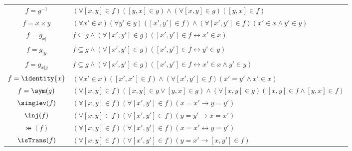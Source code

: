 \documentclass[submission,copyright,creativecommons]{eptcs}
\newcommand{\svx}{x}
\newcommand{\svy}{y}
\newcommand{\mvx}{f}
\newcommand{\mvy}{g}
\begin{document}
\begin{table}[h]
\begin{center}
\begin{small}
\begin{tabular}{|c|l|}
$\mvx=\mvy^{-1}$ & $(\forall [\svx, \svy] \in \mvx)([\svy, \svx] \in \mvy) \wedge (\forall [\svx, \svy] \in \mvy)([\svy, \svx] \in \mvx)$\\[0.0cm]

$\mvx=\svx \times \svy$ & $(\forall \svx' \in \svx)(\forall \svy' \in \svy)([\svx',\svy'] \in \mvx) \wedge
  (\forall [\svx',\svy'] \in \mvx)(\svx' \in \svx \wedge \svy' \in \svy)$\\[0.0cm]

$\mvx=\mvy_{\svx|}$ & $\mvx \subseteq \mvy \wedge (\forall [\svx',\svy'] \in \mvy)([\svx',\svy'] \in \mvx \leftrightarrow \svx' \in \svx)$\\[0.0cm] 

$\mvx=\mvy_{|\svy}$ & $\mvx \subseteq \mvy \wedge (\forall [\svx',\svy'] \in \mvy)([\svx',\svy'] \in \mvx \leftrightarrow \svy' \in \svy)$\\[0.0cm] 

$\mvx=\mvy_{\svx|\svy}$ & $\mvx \subseteq \mvy \wedge (\forall [\svx',\svy'] \in \mvy)([\svx',\svy'] \in \mvx \leftrightarrow \svx' \in \svx \wedge \svy' \in \svy)$\\[0.0cm]

$\mvx=\identity{\svx}$ & $(\forall \svx' \in \svx)([\svx',\svx'] \in f) \wedge (\forall [\svx',\svy'] \in \mvx)(\svx'=\svy' \wedge \svx' \in \svx)$\\[0.0cm]

$\mvx=\sym(\mvy)$ & $(\forall [\svx, \svy] \in \mvx)([\svx, \svy] \in \mvy \vee [\svy, \svx] \in \mvy) \wedge 
  (\forall [\svx, \svy] \in \mvy)([\svx, \svy] \in \mvx \wedge [\svy, \svx] \in \mvx)$\\[0.0cm]

$\singlev(\mvx)$ & $(\forall [\svx,\svy] \in \mvx)(\forall [\svx',\svy'] \in \mvx)(\svx=\svx' \rightarrow \svy=\svy')$\\[0.0cm]

$\inj(\mvx)$ & $(\forall [\svx,\svy] \in \mvx)(\forall [\svx',\svy'] \in \mvx)(\svy=\svy' \rightarrow \svx=\svx')$\\[0.0cm]

$\bij(\mvx)$ & $(\forall [\svx,\svy] \in \mvx)(\forall [\svx',\svy'] \in \mvx)(\svx=\svx' \leftrightarrow \svy=\svy')$\\[0.0cm]

$\isTrans(\mvx)$ & $(\forall [\svx, \svy] \in \mvx)(\forall [\svx', \svy'] \in \mvx)(\svy=\svx' \rightarrow [\svx, \svy'] \in \mvx)$\\[0.0cm]




\end{tabular}
\end{small}
\end{center}
\end{table}
\end{document}
